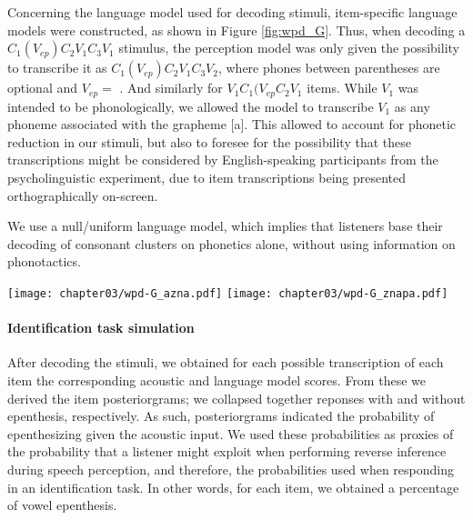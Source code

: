 {%
Concerning the language model used for decoding stimuli, item-specific language models were constructed, as shown in Figure {\color{red}\ref{fig:wpd_G}}. Thus, when decoding a $C_{1}(V_{ep})C_{2}V_{1}C_{3}V_{1}$ stimulus, the perception model was only given the possibility to transcribe it as $C_{1}(V_{ep})C_{2}V_{1}C_{3}V_{2}$, where phones between parentheses are optional and $V_{ep} = $ \textipa{[@]}. And similarly for $V_{1}C_{1}(V_{ep}C_{2}V_{1}$ items.
While $V_{1}$ was intended to be  phonologically, we allowed the model to transcribe $V_{1}$ as any phoneme associated with the grapheme [a]. This allowed to account for phonetic reduction in our stimuli, but also to foresee for the possibility that these transcriptions might be considered by English-speaking participants from the psycholinguistic experiment, due to item transcriptions being presented orthographically on-screen.

We use a null/uniform language model, which implies that listeners base their decoding of consonant clusters on phonetics alone, without using information on phonotactics.

\begin{figure*}[htb]
\centering
\texttt{[image: chapter03/wpd-G\_azna.pdf]}
\vspace{0.5cm}
\texttt{[image: chapter03/wpd-G\_znapa.pdf]}
\caption{Constrained language model used to test the models (here: LMs for  (top) and  (bottom) trials). Nodes in the graph represent states, edges represent transitions between states (here: phonemes, transcribed in WSJ notation). Models were given the choice to transcribe the phoneme  with any of the phonemes linked to the grapheme $\langle a \rangle$, as English listeners might have also done so during the task. The LMs are ``null'', as they only constrain the possible decoding outputs without assigning higher or lower probabilities to certain edges. The optimal decoding path is therefore only dependent on the acoustic scores.}
\label{fig:wpd_G}
\end{figure*}

\paragraph{Identification task simulation}
After decoding the stimuli, we obtained for each possible transcription of each item the corresponding acoustic and language model scores. From these we derived the item posteriorgrams; we collapsed together reponses with and without epenthesis, respectively. As such, posteriorgrams indicated the probability of epenthesizing \textipa{[@]} given the acoustic input. We used these probabilities as proxies of the probability that a listener might exploit when performing reverse inference during speech perception, and therefore, the probabilities used when responding in an identification task. In other words, for each item, we obtained a percentage of vowel epenthesis.

}
